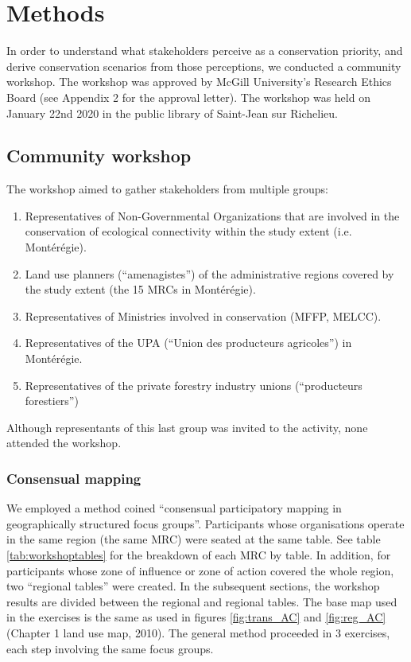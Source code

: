 \section{Methods}

In order to understand what stakeholders perceive as a conservation priority, and derive conservation scenarios from those perceptions, we conducted a community workshop. The workshop was approved by McGill University’s Research Ethics Board (see Appendix 2 for the approval letter). The workshop was held on January 22nd 2020 in the public library of Saint-Jean sur Richelieu. \\

\subsection{Community workshop}

The workshop aimed to gather stakeholders from multiple groups:
\begin{enumerate}
  \item Representatives of Non-Governmental Organizations that are involved in the conservation of ecological connectivity within the study extent (i.e. Montérégie).
  \item Land use planners (“amenagistes”) of the administrative regions covered by the study extent (the 15 MRCs in Montérégie).
  \item Representatives of Ministries involved in conservation (MFFP, MELCC).
  \item Representatives of the UPA (“Union des producteurs agricoles”) in Montérégie.
  \item Representatives of the private forestry industry unions (“producteurs forestiers”)
\end{enumerate}
Although representants of this last group was invited to the activity, none attended the workshop. \\

\subsubsection{Consensual mapping}

We employed a method coined “consensual participatory mapping in geographically structured focus groups”. Participants whose organisations operate in the same region (the same MRC) were seated at the same table. See table \ref{tab:workshoptables} for the breakdown of each MRC by table. In addition, for participants whose zone of influence or zone of action covered the whole region, two “regional tables” were created. In the subsequent sections, the workshop results are divided between the regional and regional tables. The base map used in the exercises is the same as used in figures \ref{fig:trans_AC} and \ref{fig:reg_AC} (Chapter 1 land use map, 2010). 
The general method proceeded in 3 exercises, each step involving the same focus groups.

